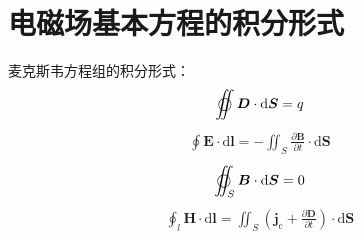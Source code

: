 \documentclass[12pt, a4paper, twoside]{ctexbook}
\begin{document}
\section{电磁场基本方程的积分形式}
{\sonti 麦克斯韦方程组的积分形式}：
\begin{eqnarray}
    \varoiint\boldsymbol{D}\cdot\mathrm{d}\boldsymbol{S}=q
\end{eqnarray}
\begin{eqnarray}
    \oint\boldsymbol{E}\cdot\mathrm{d}\boldsymbol{l}=-\iint_S\frac{\partial \boldsymbol{B}}{\partial t}\cdot\mathrm{d}\boldsymbol{S}
\end{eqnarray}
\begin{eqnarray}
    \varoiint_S\boldsymbol{B}\cdot\mathrm{d}\boldsymbol{S}=0
\end{eqnarray}
\begin{eqnarray}
    \oint_l \boldsymbol{H}\cdot\mathrm{d}\boldsymbol{l}=\iint_S\left(\boldsymbol{j}_\mathrm{c}+\frac{\partial \boldsymbol{D}}{\partial t}\right)\cdot\mathrm{d}\boldsymbol{S}
\end{eqnarray}
\end{document}
